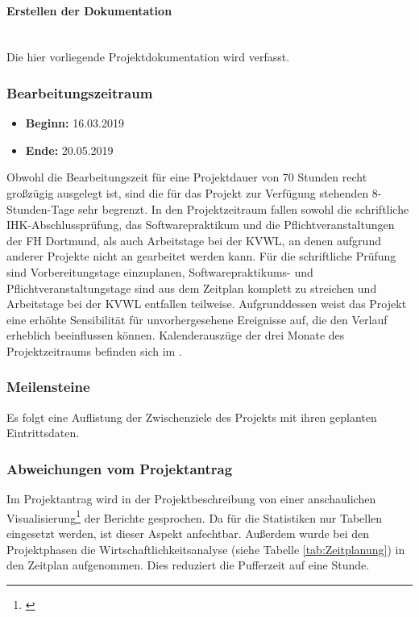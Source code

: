 \paragraph{Erstellen der Dokumentation} ~\\
\label{p:Dokumentation}
Die hier vorliegende Projektdokumentation wird verfasst.

\subsubsection{Bearbeitungszeitraum}
\label{sec:Bearbeitungszeitraum}
\begin{itemize}
	\item \textbf{Beginn:} 16.03.2019
	\item \textbf{Ende:} 20.05.2019
\end{itemize}
Obwohl die Bearbeitungszeit für eine Projektdauer von 70 Stunden recht großzügig ausgelegt ist, sind die für das Projekt zur Verfügung stehenden 8-Stunden-Tage sehr begrenzt. In den Projektzeitraum fallen sowohl die schriftliche IHK-Abschlussprüfung, das Softwarepraktikum und die Pflichtveranstaltungen der \ac{FH} Dortmund, als auch Arbeitstage bei der \ac{KVWL}, an denen aufgrund anderer Projekte nicht an \projektName gearbeitet werden kann. Für die schriftliche Prüfung sind Vorbereitungstage einzuplanen, Softwarepraktikums- und Pflichtveranstaltungstage sind aus dem Zeitplan komplett zu streichen und Arbeitstage bei der \ac{KVWL} entfallen \ggfs teilweise.
Aufgrunddessen weist das Projekt eine erhöhte Sensibilität für unvorhergesehene Ereignisse auf, die den Verlauf erheblich beeinflussen können.
Kalenderauszüge der drei Monate des Projektzeitraums befinden sich im .

\subsubsection{Meilensteine}
\label{sec:Meilensteine}
Es folgt eine Auflistung der Zwischenziele des Projekts mit ihren geplanten Eintrittsdaten.

\subsubsection{Abweichungen vom Projektantrag}
\label{sec:AbweichungenProjektantrag}
Im Projektantrag wird in der Projektbeschreibung von einer anschaulichen Visualisierung\footnote{\cite{Projektantrag}} der Berichte gesprochen. Da für die Statistiken nur Tabellen eingesetzt werden, ist dieser Aspekt anfechtbar.
Außerdem wurde bei den Projektphasen die Wirtschaftlichkeitsanalyse (siehe Tabelle \ref{tab:Zeitplanung}) in den Zeitplan aufgenommen. Dies reduziert die Pufferzeit auf eine Stunde.

\newpage
